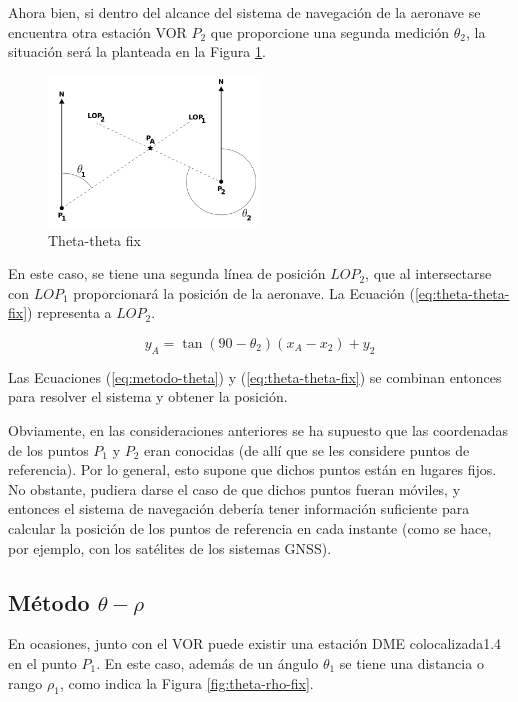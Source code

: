 Ahora bien, si dentro del alcance del sistema de navegaci\'on de la aeronave se encuentra otra estaci\'on VOR $P_2$ que proporcione una segunda medici\'on $\theta_2$, la situaci\'on ser\'a la planteada en la Figura \ref{fig:Theta-theta-fix}.

\begin{figure}[!h]
  \centering
  \includegraphics[width=0.5\textwidth]{./Imagenes/06.00.navegacion/theta-theta-fix.png}
  \caption{Theta-theta fix}
  \label{fig:Theta-theta-fix}
\end{figure}

En este caso, se tiene una segunda l\'inea de posici\'on $LOP_2$, que al intersectarse con $LOP_1$ proporcionar\'a la posici\'on de la aeronave. La Ecuaci\'on (\ref  {eq:theta-theta-fix}) representa a $LOP_2$.

\begin{equation}
  \label{eq:theta-theta-fix}
 y_A = \tan (90-\theta_2) (x_A-x_2) + y_2   
\end{equation}


Las Ecuaciones (\ref{eq:metodo-theta}) y (\ref  {eq:theta-theta-fix}) se combinan entonces para resolver el sistema y obtener la posici\'on.

Obviamente, en las consideraciones anteriores se ha supuesto que las coordenadas de los puntos $P_1$ y $P_2$ eran conocidas (de all\'i que se les considere puntos de referencia). Por lo general, esto supone que dichos puntos est\'an en lugares fijos. No obstante, pudiera darse el caso de que dichos puntos fueran m\'oviles, y entonces el sistema de navegaci\'on deber\'ia tener informaci\'on suficiente para calcular la posici\'on de los puntos de referencia en cada instante (como se hace, por ejemplo, con los sat\'elites de los sistemas GNSS). 

\subsection{M\'etodo $\theta-\rho$}

En ocasiones, junto con el VOR puede existir una estaci\'on DME colocalizada1.4 en el punto $P_1$. En este caso, adem\'as de un \'angulo $\theta_1$ se tiene una distancia o rango $\rho_1$, como indica la Figura \ref{fig:theta-rho-fix}.


